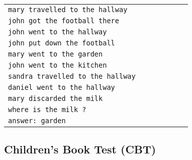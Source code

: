 \documentclass{article} \usepackage{iclr2016_conference,times}
\begin{document}
\begin{table}[t]
{\begin{minipage}{0.5\textwidth}
{\begin{tabular}{lllllll}
          \texttt{mary travelled to the hallway} \\
          \texttt{john got the football there} \\
          \texttt{john went to the hallway}\\
          \texttt{john put down the football} \\
          \texttt{mary went to the garden} \\
          \texttt{john went to the kitchen} \\
          \texttt{sandra travelled to the hallway} \\
          \texttt{daniel went to the hallway} \\
          \texttt{mary discarded the milk}\\
          \texttt{where is the milk ?}\\
          \texttt{answer: garden} \\
          \hline
        \end{tabular}
      }
    \end{minipage}
  }
\end{table}

\begin{comment}
          \texttt{mary got the milk there} \\ 
          \texttt{john moved to the bedroom} \\
          \texttt{sandra went back to the kitchen} \\
          \texttt{mary travelled to the hallway} \\
          \texttt{john got the football there} \\
          \texttt{john went to the hallway}\\
          \texttt{john put down the football} \\
          \texttt{mary went to the garden} \\
          \texttt{john went to the kitchen} \\
          \texttt{sandra travelled to the hallway} \\
          \texttt{daniel went to the hallway} \\
          \texttt{mary discarded the milk}\\
          \texttt{where is the milk ?}\\
          \texttt{answer: garden} \\
\end{comment}

\subsection{Children's Book Test (CBT)}
\end{document}
